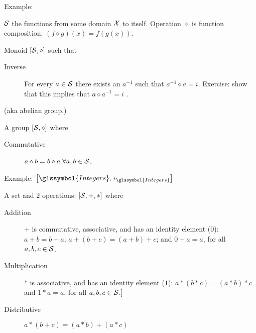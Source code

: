 Example: 

$\mathcal{S}$ the functions from some domain $\mathcal{X}$ to itself. 
Operation $\diamond$ is function composition:
$\left( f \diamond g \right) (x) = 
f \left( g \left( x \right) \right)$.



Monoid $\left[ \mathcal{S}, \diamond \right]$ such that
\begin{description}
 \item[Inverse] For every $a \in \mathcal{S}$ there exists an
 $a^{-1}$ such that $a^{-1} \diamond a = i$.
 Exercise: show that this implies that $a \diamond a^{-1} = i$ .
\end{description}


(aka abelian group.)

A group $\left[ \mathcal{S}, \diamond \right]$ where
\begin{description}
 \item[Commutative] $a \diamond b = b \diamond a \; \forall a,b \in \mathcal{S}$.
\end{description}

Example: 
$\left[ \glssymbol{Integers}, *_{\glssymbol{Integers}} \right]$

\label{sec:Semiring}

A set and $2$ operations: $\left[ \mathcal{S}, +, * \right]$
where
\begin{description}
  \item[Addition] $+$ is commutative, associative, and has an 
  identity element ($0$):
  $a + b = b + a$; 
  $a + \left( b + c \right) =\left( a + b  \right) + c $;
   and $ 0 + a = a$, for all $a,b,c \in \mathcal{S}$.
  \item[Multiplication] $*$ is associative, and has an 
  identity element ($1$):
 $a * \left( b * c \right) =\left( a * b \right) * c $
  and $ 1 * a = a$, for all $a,b,c \in \mathcal{S}$.]
  \item[Distributive] $a * \left( b + c \right) 
  = \left( a * b \right) + \left( a * c \right)$
\end{description}

